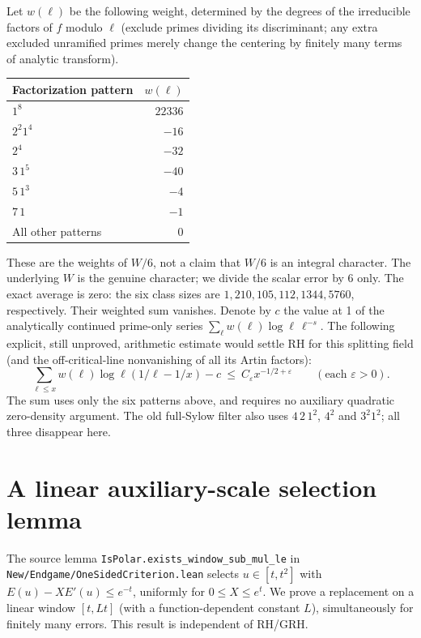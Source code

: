 \documentclass[11pt]{article}
\theoremstyle{remark}\newtheorem{remark}[theorem]{Remark}
\newcommand{\eps}{\varepsilon}
\begin{document}
Let $w(\ell)$ be the following weight, determined by the degrees of
the irreducible factors of $f$ modulo $\ell$ (exclude primes dividing
its discriminant; any extra excluded unramified primes merely change
the centering by finitely many terms of analytic transform).
\begin{center}
\begin{tabular}{lr}\toprule
Factorization pattern & $w(\ell)$\\\midrule
$1^8$&$22336$\\
$2^2 1^4$&$-16$\\
$2^4$&$-32$\\
$3\,1^5$&$-40$\\
$5\,1^3$&$-4$\\
$7\,1$&$-1$\\
All other patterns&$0$\\\bottomrule
\end{tabular}
\end{center}
These are the weights of $W/6$, not a claim that $W/6$ is an integral
character. The underlying $W$ is the genuine character; we divide
the scalar error by 6 only. The exact average is zero: the six class
sizes are $1,210,105,112,1344,5760$, respectively. Their weighted sum
vanishes. Denote by $c$ the value at 1 of the analytically continued
prime-only series $\sum_\ell w(\ell)\log\ell\,\ell^{-s}$.
The following explicit, still unproved, arithmetic estimate would
settle RH for this splitting field (and the off-critical-line
nonvanishing of all its Artin factors):
\begin{equation}\label{eq:s8}
 \sum_{\ell\le x}w(\ell)\log\ell(1/\ell-1/x)-c
 \ \le\ C_\eps x^{-1/2+\eps}\qquad(\text{each }\eps>0).
\end{equation}
The sum uses only the six patterns above, and requires no auxiliary
quadratic zero-density argument. The old full-Sylow filter also uses
$4\,2\,1^2$, $4^2$ and $3^2 1^2$; all three disappear here.

\section{A linear auxiliary-scale selection lemma}
The source lemma \nolinkurl{IsPolar.exists_window_sub_mul_le} in
\nolinkurl{New/Endgame/OneSidedCriterion.lean} selects $u\in[t,t^2]$ with
$E(u)-XE'(u)\le e^{-t}$, uniformly for $0\le X\le e^t$.
We prove a replacement on a linear window $[t,Lt]$ (with a
function-dependent constant $L$), simultaneously for finitely many
errors. This result is independent of RH/GRH.
\end{document}
